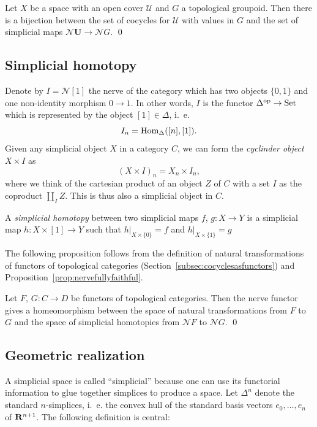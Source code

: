 \documentclass[a4paper,openany]{scrbook}
\newcommand{\nerve}{\mathcal N}
\begin{document}
\begin{corollary}
Let $X$ be a space with an open cover $\mathcal U$ and $G$ a topological groupoid. Then there is a bijection between the set of cocycles for $\mathcal U$ with values in $G$ and the set of simplicial maps $\nerve \mathbf U \to \nerve G$. \qed
\end{corollary}

\subsection{Simplicial homotopy}

Denote by $I=\nerve [1]$ the nerve of the category which has two objects $\{0,1\}$ and one non-identity morphism $0 \to 1$. In other words, $I$ is the functor $\Delta^{\operatorname{op}}\to\operatorname{Set}$ which is represented by the object $[1] \in \Delta$, i.~e.
\[
I_n = \operatorname{Hom}_{\Delta}([n],[1]).
\]
Given any simplicial object $X$ in a category $C$, we can form the \emph{cyclinder object} $X \times I$ as
\[
(X \times I)_n = X_n \times I_n,
\]
where we think of the cartesian product of an object $Z$ of $C$ with a set $I$ as the coproduct $\coprod_I Z$. This is thus also a simplicial object in $C$.

\begin{defn}
A \emph{simplicial homotopy} between two simplicial maps $f$, $g\colon X \to Y$ is a simplicial map $h\colon X \times [1] \to Y$ such that $h|_{X \times \{0\}} = f$ and $h|_{X \times \{1\}} = g$
\end{defn}

The following proposition follows from the definition of natural transformations of functors of topological categories (Section~\ref{subsec:cocyclesasfunctors}) and Proposition~\ref{prop:nervefullyfaithful}.

\begin{prop}
Let $F$, $G\colon C \to D$ be functors of topological categories. Then the nerve functor gives a homeomorphism between the space of natural transformations from $F$ to $G$ and the space of simplicial homotopies from $\nerve F$ to $\nerve G$. \qed
\end{prop}

\subsection{Geometric realization}

A simplicial space is called “simplicial” because one can use its functorial information to glue together simplices to produce a space. Let $\Delta^n$ denote the standard $n$-simplices, i.~e. the convex hull of the standard basis vectors $e_0,\dots,e_n$ of $\mathbf R^{n+1}$. The following definition is central:
\end{document}
